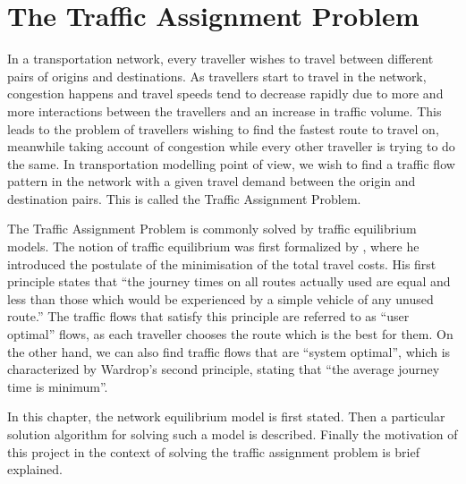 \chapter{The Traffic Assignment Problem} \label{chap:ta}

In a transportation network,
every traveller wishes to travel between different pairs of origins and destinations.
As travellers start to travel in the network,
congestion happens and travel speeds tend to decrease rapidly due to more and more interactions between the travellers and an increase in traffic volume.
This leads to the problem of travellers wishing to find the fastest route to travel on,
meanwhile taking account of congestion while every other traveller is trying to do the same.
In transportation modelling point of view,
we wish to find a traffic flow pattern in the network with a given travel demand between the origin and destination pairs. 
This is called the Traffic Assignment Problem.

The Traffic Assignment Problem is commonly solved by traffic equilibrium models.
The notion of traffic equilibrium was first formalized by \cite{Wardrop},
where he introduced the postulate of the minimisation of the total travel costs.
His first principle states that ``the journey times on all routes actually used are equal and less than those which would be experienced by a simple vehicle of any unused route.''
The traffic flows that satisfy this principle are referred to as ``user optimal'' flows,
as each traveller chooses the route which is the best for them.
On the other hand,
we can also find traffic flows that are ``system optimal'',
which is characterized by Wardrop's second principle, stating that ``the average journey time is minimum''.

In this chapter,
the network equilibrium model is first stated.
Then a particular solution algorithm for solving such a model is described.
Finally the motivation of this project in the context of solving the traffic assignment problem is brief explained.


